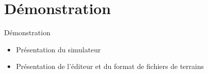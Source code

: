 \section{Démonstration}
\begin{frame}{Démonstration}
\begin{itemize}
	\item Présentation du simulateur
	\item Présentation de l'éditeur et du format de fichiers de terrains
\end{itemize}
\end{frame}
